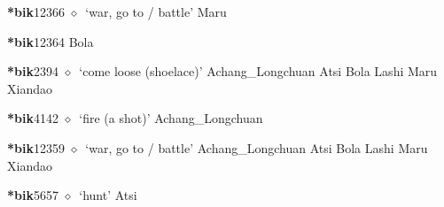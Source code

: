   \begin{list}{}{\leftmargin=1.5em \itemindent=-1.5em}
  \item {\footnotesize \textbf{*bik}}{\tiny 12366}
         $\diamond$~`war, go to / battle'
         Maru 
  \item {\footnotesize \textbf{*bik}}{\tiny 12364}
\hspace{1ex}
         Bola 
  \item {\footnotesize \textbf{*bik}}{\tiny 2394}
\hspace{1ex}
         $\diamond$~`come loose (shoelace)'
         Achang\_Longchuan 
\hspace{1ex}
         Atsi 
\hspace{1ex}
         Bola 
\hspace{1ex}
         Lashi 
\hspace{1ex}
         Maru 
\hspace{1ex}
         Xiandao 
  \item {\footnotesize \textbf{*bik}}{\tiny 4142}
\hspace{1ex}
         $\diamond$~`fire (a shot)'
         Achang\_Longchuan 
  \item {\footnotesize \textbf{*bik}}{\tiny 12359}
\hspace{1ex}
         $\diamond$~`war, go to / battle'
         Achang\_Longchuan 
\hspace{1ex}
         Atsi 
\hspace{1ex}
         Bola 
\hspace{1ex}
         Lashi 
\hspace{1ex}
         Maru 
\hspace{1ex}
         Xiandao 
  \item {\footnotesize \textbf{*bik}}{\tiny 5657}
\hspace{1ex}
         $\diamond$~`hunt'
         Atsi 

\end{list}
